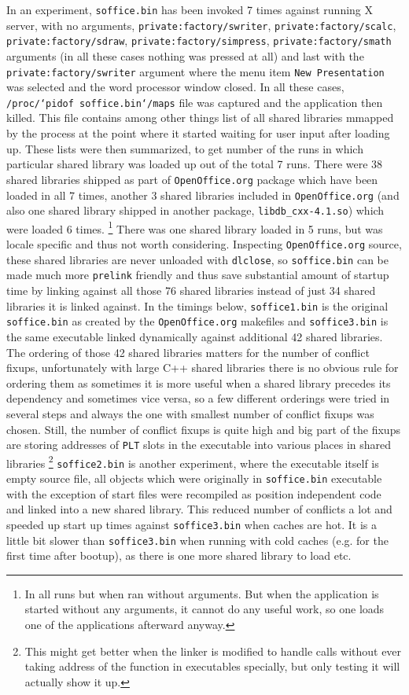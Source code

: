 \documentclass[twoside]{article}
\def\tts#1{\texttt{\small #1}}
\begin{document}
In an experiment, \tts{soffice.bin} has been invoked 7 times against running
X server, with no arguments, \tts{private:factory/swriter},
\tts{private:factory/scalc}, \tts{private:factory/sdraw},
\tts{private:factory/simpress}, \tts{private:factory/smath} arguments
(in all these cases nothing was pressed at all) and last with
the \tts{private:factory/swriter} argument where the menu item \tts{New Presentation}
was selected and the word processor window closed.
In all these cases, \tts{/proc/`pidof soffice.bin`/maps} file was
captured and the application then killed.  This file contains among
other things list of all shared libraries mmapped by the process at
the point where it started waiting for user input after loading up.
These lists were then summarized, to get number of the runs in
which particular shared library was loaded up out of the total 7
runs.  There were 38 shared libraries shipped as part of \tts{OpenOffice.org}
package which have been loaded in all 7 times, another 3 shared
libraries included in \tts{OpenOffice.org} (and also one shared
library shipped in another package, \tts{libdb\_cxx-4.1.so})
which were loaded 6 times.
\footnote{In all runs but when ran without
arguments.  But when the application is started without any
arguments, it cannot do any useful work, so one loads one of the
applications afterward anyway.}  There was one shared library
loaded in 5 runs, but was locale specific and thus not worth
considering.  Inspecting \tts{OpenOffice.org} source, these shared
libraries are never unloaded with \tts{dlclose}, so \tts{soffice.bin}
can be made much more \tts{prelink} friendly and thus save substantial
amount of startup time by linking against all those 76 shared libraries
instead of just 34 shared libraries it is linked against.
In the timings below, \tts{soffice1.bin} is the original \tts{soffice.bin}
as created by the \tts{OpenOffice.org} makefiles and \tts{soffice3.bin} is
the same executable linked dynamically against additional 42 shared libraries.
The ordering of those 42 shared libraries matters for the number of conflict
fixups, unfortunately with large C++ shared libraries there is no obvious rule
for ordering them as sometimes it is more useful when a shared library precedes
its dependency and sometimes vice versa, so a few different orderings were
tried in several steps and always the one with smallest number of conflict
fixups was chosen.  Still, the number of conflict fixups is quite high
and big part of the fixups are storing addresses of \tts{PLT} slots in
the executable into various places in shared libraries
\footnote{This might get better when the linker is modified to handle
calls without ever taking address of the function in executables specially,
but only testing it will actually show it up.}
\tts{soffice2.bin} is another experiment, where the executable itself is empty
source file, all objects which were originally in \tts{soffice.bin}
executable with the exception of start files were recompiled as position independent
code and linked into a new shared library.  This reduced number of conflicts
a lot and speeded up start up times against \tts{soffice3.bin} when caches
are hot.  It is a little bit slower than \tts{soffice3.bin} when running
with cold caches (e.g. for the first time after bootup), as there is one
more shared library to load etc.
\end{document}
